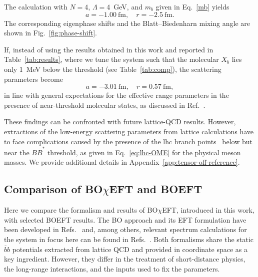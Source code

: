\documentclass[aps,prd,showpacs,amsmath,twocolumn,superscriptaddress,floatfix,nofootinbib,notitlepage]{revtex4-2}
\newcommand{\be}{\begin{equation}}
\newcommand{\ee}{\end{equation}}
\newcommand{\Xb}{X_b}
\newcommand{\BOchiEFT}{BO$\chi$EFT\xspace}
\begin{document}
The calculation with $N=4$, $\Lambda=4$~GeV, and $m_b$ given in Eq.~\eqref{mb} yields
\be
a=-1.00~\mbox{fm},\quad r=-2.5~\mbox{fm}.
\label{eq:aandr}
\ee
The corresponding eigenphase shifts and the Blatt--Biedenharn mixing angle are shown in Fig.~\ref{fig:phase-shift}.

If, instead of using the results obtained in this work and reported in Table~\ref{tab:results}, where we tune the system such that the molecular $\Xb$ lies only 1~MeV below the threshold (see Table~\ref{tab:comp}), the scattering parameters become
\be
a=-3.01~\mbox{fm},\quad r=0.57~\mbox{fm},
\label{eq:aandr2}
\ee
in line with general expectations
for the effective range parameters in the presence of
near-threshold molecular states, as discussed in Ref.~\cite{Guo:2017jvc}.

These findings can be confronted with future lattice-QCD results.
However, extractions of the low-energy scattering parameters from lattice calculations have to face complications caused by the presence of the lhc branch points~\cite{Du:2023hlu} below but near the $B\bar{B}^*$ threshold, as given in Eq.~\eqref{eq:lhc-OME} for the physical meson masses. We provide additional details 
in Appendix~\ref{app:tensor-off-reference}.

\subsection{Comparison of \BOchiEFT and BOEFT}
\label{sec:comparison}

Here we compare the formalism and results of \BOchiEFT, introduced in this work, with 
selected BOEFT results. The BO approach and its EFT formulation have been developed in
Refs.~\cite{Berwein:2015vca,Brambilla:2017uyf,Oncala:2017hop,Soto:2020xpm, TarrusCastella:2022rxb,Berwein:2024ztx,Brambilla:2024imu,Brambilla:2026zfw,Brambilla:2026jqz} and, among others, relevant spectrum calculations for the system in focus here can be found in Refs.~\cite{Braaten:2024tbm,Brambilla:2024imu,Brambilla:2026zfw,Brambilla:2026jqz}. 
Both formalisms share the static $\bar{b}b$ potentials extracted from lattice QCD and provided in coordinate space as a key ingredient.
However, they differ in the treatment of short-distance physics, the long-range interactions, and the inputs used to fix the parameters.
\end{document}
